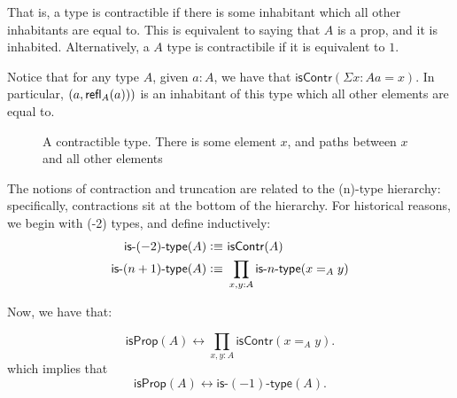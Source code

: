 \documentclass[11pt]{article}
\newcommand*{\isProp}{\mathsf{isProp}}
\newcommand*{\isContr}{\mathsf{isContr}}
\newcommand*{\isNtype}[1]{\mathsf{is}\mbox{-}#1\mbox{-}\mathsf{type}}
\begin{document}
That is, a type is contractible if there is some inhabitant which all other
inhabitants are equal to. This is equivalent to saying that $A$ is a prop, and
it is inhabited. Alternatively, a $A$ type is contractibile if it is equivalent
to $1$. 

Notice that for any type $A$, given $a{:}A$, we have that $\isContr(\Sigma
x{:}A a = x)$. In particular, $(a,\mathsf{refl}_{A}(a)))$ is an inhabitant of
this type which all other elements are equal to.

\begin{figure}
\label{fig:contractible}
\begin{center}
\end{center}
\caption{A contractible type. There is some element $x$, and paths between $x$ and all other elements}
\end{figure}

The notions of contraction and truncation are related to the (n)-type hierarchy: 
specifically, contractions sit at the bottom of the hierarchy. For historical reasons,
we begin with (-2) types, and define inductively:
\begin{align*}
 \isNtype{(-2)}(A)\defeq&\ \isContr(A) \\ %
 \isNtype{(n+1)}(A)\defeq &\ \prod_{x,y:A}\isNtype{n}(x=_A y)
\end{align*}

Now, we have that: 

 $$\isProp(A)\leftrightarrow \prod_{x,y:A}\isContr(x=_A y).$$
which implies that
$$\isProp(A)\leftrightarrow \isNtype{(-1)}(A).$$
\end{document}
